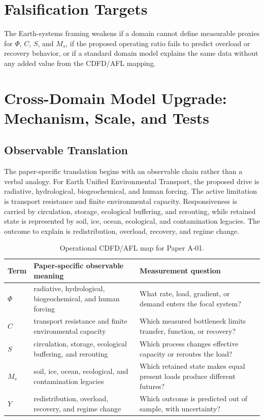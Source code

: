 \documentclass[12pt,a4paper]{article}
\begin{document}
\section{Falsification Targets}

The Earth-systems framing weakens if a domain cannot define measurable
proxies for $\Phi$, $C$, $S$, and $M_s$, if the proposed operating ratio fails
to predict overload or recovery behavior, or if a standard domain model explains
the same data without any added value from the CDFD/AFL mapping.

\section{Cross-Domain Model Upgrade: Mechanism, Scale, and Tests}

\subsection{Observable Translation}

The paper-specific translation begins with an observable chain rather than a
verbal analogy. For Earth Unified Environmental Transport, the proposed drive is radiative, hydrological, biogeochemical, and human forcing.
The active limitation is transport resistance and finite environmental capacity. Responsiveness is carried by
circulation, storage, ecological buffering, and rerouting, while retained state is represented by
soil, ice, ocean, ecological, and contamination legacies. The outcome to explain is redistribution, overload, recovery, and regime change.

\begin{table}[htbp]
\centering
\small
\caption{Operational CDFD/AFL map for Paper A-01.}
\begin{tabularx}{\textwidth}{|l|X|X|}
\hline
\textbf{Term} & \textbf{Paper-specific observable meaning} & \textbf{Measurement question} \\
\hline
$\Phi$ & radiative, hydrological, biogeochemical, and human forcing & What rate, load, gradient, or demand enters the focal system? \\
\hline
$C$ & transport resistance and finite environmental capacity & Which measured bottleneck limits transfer, function, or recovery? \\
\hline
$S$ & circulation, storage, ecological buffering, and rerouting & Which process changes effective capacity or reroutes the load? \\
\hline
$M_s$ & soil, ice, ocean, ecological, and contamination legacies & Which retained state makes equal present loads produce different futures? \\
\hline
$Y$ & redistribution, overload, recovery, and regime change & Which outcome is predicted out of sample, with uncertainty? \\
\hline
\end{tabularx}
\end{table}
\end{document}
